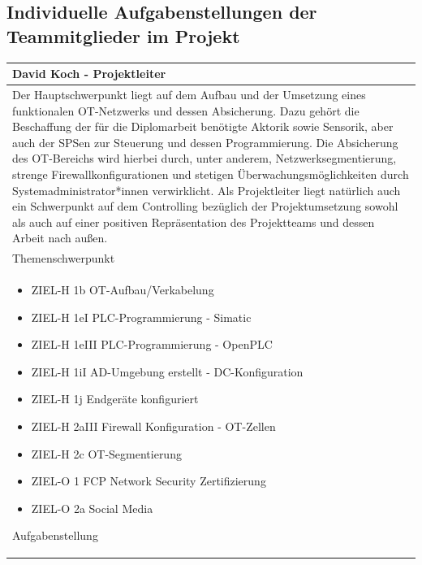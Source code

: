 \documentclass[
	headings=optiontotocandhead,%
	oneside,
	numbers=noenddot,%
	toc=flat, %
	10pt, %
	parskip=full, %
	listof=totoc, %
	listof=flat, %
	numbers=noenddot, %
	bibliography=totoc, %
	a4paper,DIV=14,
]{scrartcl}
\begin{document}
\subsection{Individuelle Aufgabenstellungen der Teammitglieder im Projekt}
\begin{table}[H]
	\begin{tabularx} {\textwidth} {
			|>{\hsize=1\hsize}X|
		}
		
		\hline
		\rowcolor[HTML]{D9D9D9} 
		\rule{0pt}{15pt}
		\textbf{\normalsize{David Koch - Projektleiter}} \\ \hline
		
		\rule{0pt}{20pt}Der Hauptschwerpunkt liegt auf dem Aufbau und der Umsetzung eines funktionalen OT-Netzwerks und dessen Absicherung. Dazu gehört die Beschaffung der für die Diplomarbeit benötigte Aktorik sowie Sensorik, aber auch der SPSen zur Steuerung und dessen Programmierung. Die Absicherung des OT-Bereichs wird hierbei durch, unter anderem, Netzwerksegmentierung, strenge Firewallkonfigurationen und stetigen Überwachungsmöglichkeiten durch Systemadministrator*innen verwirklicht. Als Projektleiter liegt natürlich auch ein Schwerpunkt auf dem Controlling bezüglich der Projektumsetzung sowohl als auch auf einer positiven Repräsentation des Projektteams und dessen Arbeit nach außen.  \\
		\rule{0pt}{11pt}\textcolor[HTML]{A6A6A6}{\footnotesize{Themenschwerpunkt}} \\ \hline
		
		\begin{itemize}[itemsep=0pt, parsep=0pt, topsep=0pt]
			\item{ZIEL-H 1b OT-Aufbau/Verkabelung}
			\item{ZIEL-H 1eI PLC-Programmierung - Simatic}
			\item{ZIEL-H 1eIII PLC-Programmierung - OpenPLC}
			\item{ZIEL-H 1iI AD-Umgebung erstellt - DC-Konfiguration}
			\item{ZIEL-H 1j Endgeräte konfiguriert}
			\item{ZIEL-H 2aIII Firewall Konfiguration - OT-Zellen}
			\item{ZIEL-H 2c OT-Segmentierung}
			\item{ZIEL-O 1 FCP Network Security Zertifizierung}
			\item{ZIEL-O 2a Social Media}
		\end{itemize}
		
		\rule{0pt}{11pt}\textcolor[HTML]{A6A6A6}{\footnotesize{Aufgabenstellung}} \\ \hline
	\end{tabularx}
\end{table}
\end{document}
